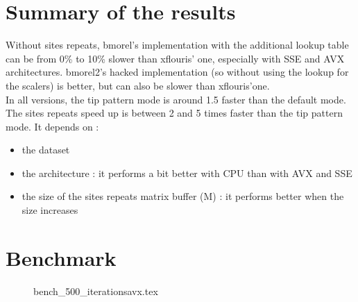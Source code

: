 \documentclass[a4paper]{article}
\begin{document}
\newpage

\section{Summary of the results}



Without sites repeats, bmorel's implementation with the additional lookup table can be from 0\% to 10\% slower than xflouris' one, especially with SSE and AVX architectures. bmorel2's hacked implementation (so without using the lookup for the scalers) is better, but can also be slower than xflouris'one.\\

In all versions, the tip pattern mode is around 1.5 faster than the default mode.\\

The sites repeats speed up is between 2 and 5 times faster than the tip pattern mode. 
It depends on :
\begin{itemize}
\item the dataset 
\item the architecture : it performs a bit better with CPU than with AVX and SSE
\item the size of the sites repeats matrix buffer (M) : it performs better when the size increases
\end{itemize}


\newpage

\section{Benchmark}


\begin{figure}[!htb]
{bench_500_iterationsavx.tex}
\end{figure}
\end{document}
